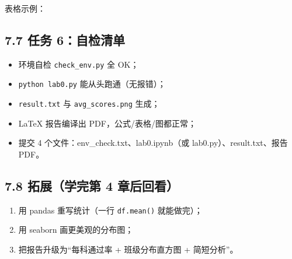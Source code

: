表格示例：

\begin{Shaded}
\begin{Highlighting}[]
\NormalTok{\{}
\OperatorTok{\&}\OperatorTok{\&}\FunctionTok{\textbackslash{}\textbackslash{}}
\OperatorTok{\&}\OperatorTok{\&}\FunctionTok{\textbackslash{}\textbackslash{}}
\NormalTok{\{}\NormalTok{\}}
\end{Highlighting}
\end{Shaded}

\subsection{7.7 任务
6：自检清单}\label{ux4efbux52a1-6ux81eaux68c0ux6e05ux5355}

\begin{itemize}
\tightlist
\item[$\square$]
  环境自检 \texttt{check\_env.py} 全 OK；
\item[$\square$]
  \texttt{python\ lab0.py} 能从头跑通（无报错）；
\item[$\square$]
  \texttt{result.txt} 与 \texttt{avg\_scores.png} 生成；
\item[$\square$]
  LaTeX 报告编译出 PDF，公式/表格/图都正常；
\item[$\square$]
  提交 4 个文件：env\_check.txt、lab0.ipynb（或
  lab0.py）、result.txt、报告 PDF。
\end{itemize}

\subsection{7.8 拓展（学完第 4
章后回看）}\label{ux62d3ux5c55ux5b66ux5b8cux7b2c-4-ux7ae0ux540eux56deux770b}

\begin{enumerate}
\def\labelenumi{\arabic{enumi}.}
\tightlist
\item
  用 pandas 重写统计（一行 \texttt{df.mean()} 就能做完）；
\item
  用 seaborn 画更美观的分布图；
\item
  把报告升级为``每科通过率 + 班级分布直方图 + 简短分析''。
\end{enumerate}

